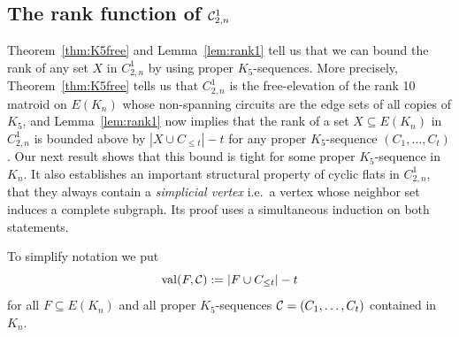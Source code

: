 \documentclass{daj}
\begin{document}
\subsection{\boldmath The rank function of ${\cal C}^1_{2,n}$}
Theorem~\ref{thm:K5free} and Lemma~\ref{lem:rank1} tell us that we can bound the rank of any set $X$ in 
$C_{2,n}^1$ by using proper $K_5$-sequences.
%
%
More precisely, Theorem~\ref{thm:K5free} tells us that  $C_{2,n}^1$ is the free-elevation of the rank 10 matroid on $E(K_n)$ whose non-spanning circuits are the edge sets of all copies of $K_5$, and Lemma~\ref{lem:rank1} now implies  that
the rank of a set $X\subseteq E(K_n)$ in $C_{2,n}^1$ is bounded above by
$|X\cup C_{\leq t}|-t$
for any proper $K_{5}$-sequence  $(C_1,\dots, C_t)$.
Our next result shows that this bound is tight for some proper $K_{5}$-sequence in $K_n$. It also establishes an important structural property of cyclic flats in $C_{2,n}^1$, that they always contain a {\em simplicial vertex} i.e.~a vertex whose neighbor set induces a complete subgraph. Its proof uses a simultaneous induction on both statements.

To simplify notation we put
\[
{\rm val}(F, {\cal C}):=|F\cup C_{\leq t}|-t
\]
for all $F\subseteq E(K_n)$ and  all proper $K_{5}$-sequences  ${\cal C}=(C_1,\dots, C_t)$ contained in $K_n$.
\end{document}
